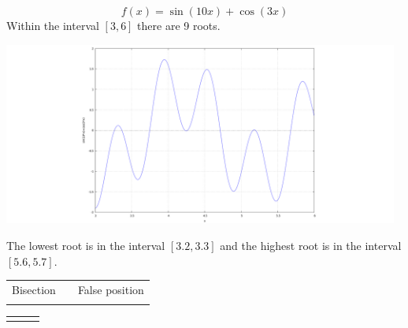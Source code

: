 \begin{equation*}
	f(x)=\sin(10x)+\cos(3x)
\end{equation*}
Within the interval $[3,6]$ there are 9 roots.
\begin{center} \includegraphics[height=60mm,keepaspectratio]{EXER1T1-1-a} \end{center}

The lowest root is in the interval $[3.2,3.3]$ and the highest root is in the interval $[5.6,5.7]$.
\newpage

\begin{center}
\begin{tabular}{ p{73mm} p{0mm} p{73mm} }
	Bisection & & False position \\
	 & &
	
\end{tabular}
\end{center}

\begin{center}
\begin{tabular}{ p{73mm} p{0mm} p{73mm} }
	
	& &
	
\end{tabular}
\end{center}
